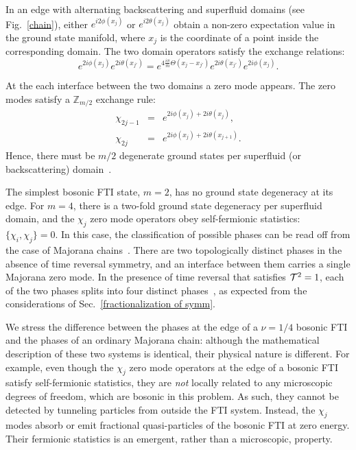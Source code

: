 \documentclass[twocolumn,aps,prb,showpacs]{revtex4-1}
\begin{document}
In an edge with alternating backscattering and superfluid domains (see Fig.~\ref{chain}), either  $e^{i2\phi(x_j)} $ or $e^{i2\theta(x_j)}$ obtain a non-zero expectation value in the ground state manifold, where $x_j$ is the coordinate of a point inside the corresponding domain. The two  domain operators satisfy the exchange relations:
\begin{equation}
e^{2i\phi(x_{j})}e^{2i\theta(x_{j'})}=e^{4\frac{i\pi}{m}\Theta(x_{j}-x_{j'})}e^{2i\theta(x_{j'})}e^{2i\phi(x_{j})}.
\end{equation}

At the each interface between the two domains a zero mode appears. The zero modes satisfy a $\mathbb{Z}_{m/2} $ exchange rule:
\begin{eqnarray}
 \nonumber
 \chi_{2j-1} &=& e^{2i\phi(x_{j})+2i\theta(x_{j})}, \\
 \chi_{2j} &=& e^{2i\phi(x_{j})+2i\theta(x_{j+1})}.
 \end{eqnarray}
Hence, there must be $m/2$ degenerate ground states per superfluid (or backscattering) domain~\cite{Maghrebi2015}.

The simplest bosonic FTI state, $m=2$, has no ground state degeneracy at its edge. For $m=4$, there is a two-fold ground state degeneracy per superfluid domain, and the $\chi_j$ zero mode operators obey self-fermionic statistics: $\{ \chi_i, \chi_j \} = 0$. In this case, the classification of possible phases can be read off from the case of Majorana chains~\cite{Fidkowski2010, Turner2011, Fidkowski2011a}. There are two topologically distinct phases in the absence of time reversal symmetry, and an interface between them carries a single Majorana zero mode. In the presence of time reversal that satisfies ${\cal T}^2=1$, each of the two phases splits into four distinct phases~\cite{}, as expected from the considerations of Sec.~\ref{fractionalization of symm}.

We stress the difference between the phases at the edge of a $\nu=1/4$ bosonic FTI and the phases of an ordinary Majorana chain: although the mathematical description of these two systems is identical, their physical nature is different. For example, even though the $\chi_j$ zero mode operators at the edge of a bosonic FTI satisfy self-fermionic statistics, they are \emph{not} locally related to any microscopic degrees of freedom, which are bosonic in this problem. As such, they cannot be detected by tunneling particles from  outside the FTI system. Instead, the $\chi_j$ modes absorb or emit fractional quasi-particles of the bosonic FTI at zero energy. Their fermionic statistics is an emergent, rather than a microscopic, property.
\end{document}
